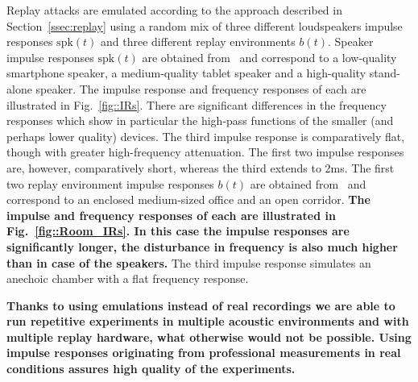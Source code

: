 Replay attacks are emulated according to the approach described in Section~\ref{ssec:replay} 
using a random mix of three different loudspeakers impulse responses $\mathrm{spk}(t)$ and three different replay environments $b(t)$.  
Speaker impulse responses $\mathrm{spk}(t)$ are obtained from~\cite{Brown2014} and correspond to a low-quality smartphone speaker, a medium-quality tablet speaker and a high-quality stand-alone speaker.  The impulse response and frequency responses of each are illustrated in Fig.~\ref{fig::IRs}.  There are significant differences in the frequency responses which show in particular the high-pass functions of the smaller (and perhaps lower quality) devices.  The third impulse response is comparatively flat, though with greater high-frequency attenuation.  The first two impulse responses are, however, comparatively short, whereas the third extends to 2ms.  The first two replay environment impulse responses $b(t)$ are obtained from~\cite{Jeub2009} and correspond to an enclosed medium-sized office and an open corridor. {\bfseries  The impulse and frequency responses of each are illustrated in Fig.~\ref{fig::Room_IRs}. In this case the impulse responses are significantly longer, the disturbance in frequency is also much higher than in case of the speakers.}  The third impulse response simulates an anechoic chamber with a flat frequency response. 

{\bfseries Thanks to using emulations instead of real recordings we are able to run repetitive experiments in multiple acoustic environments and with multiple replay hardware, what otherwise would not be possible. Using impulse responses originating from professional measurements in real conditions assures high quality of the experiments.} %



